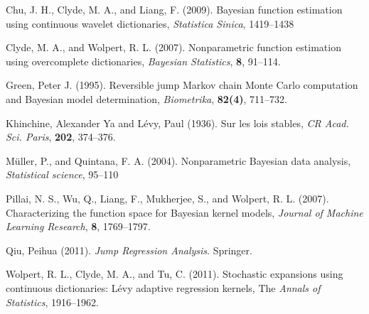 \documentclass[12pt]{article}
\begin{document}
\begin{description}
	

\item
Chu, J. H., Clyde, M. A., and Liang, F. (2009).
Bayesian function estimation using continuous wavelet dictionaries,
\textit{Statistica Sinica}, 1419--1438

\item
Clyde, M. A., and Wolpert, R. L. (2007).
Nonparametric function estimation using overcomplete dictionaries,
\textit{Bayesian Statistics}, 
\textbf{8}, 91--114.


\item
Green, Peter J. (1995).
Reversible jump Markov chain Monte Carlo computation and Bayesian model determination,
\textit{Biometrika}, \textbf{82(4)}, 711--732.


\item 
Khinchine, Alexander Ya and L{\'e}vy, Paul (1936).
Sur les lois stables, \textit{CR Acad. Sci. Paris}, 
\textbf{202}, 374--376.


\item 
M{\"u}ller, P., and Quintana, F. A. (2004).
Nonparametric Bayesian data analysis,
\textit{Statistical science}, 95--110


\item 
Pillai, N. S., Wu, Q., Liang, F., Mukherjee, S., and Wolpert, R. L. (2007). 
Characterizing the function space for Bayesian kernel models,
\textit{Journal of Machine Learning Research}, 
\textbf{8}, 1769--1797.

\item 
Qiu, Peihua (2011).
\textit{Jump Regression Analysis}.
Springer.


\item  
Wolpert, R. L., Clyde, M. A., and Tu, C. (2011).
Stochastic expansions using continuous dictionaries: L{\'e}vy adaptive regression kernels, The \textit{Annals of Statistics},
1916--1962.


\end{description}
\end{document}
